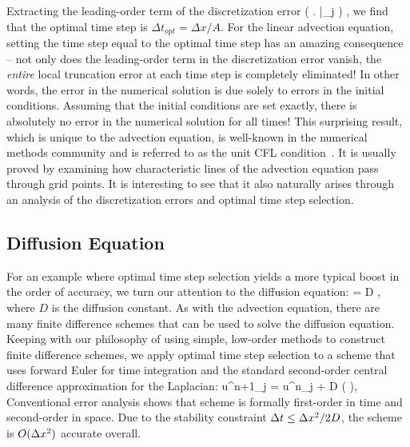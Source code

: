 \documentclass[oneeqnum,onefignum,onetabnum,onethmnum]{siamltex}
\begin{document}
Extracting the leading-order term of the discretization error
\beq
  \left( \left.   \right|_j \right)
  \left[ \dx - A \dt \right] \dt,
\eeq
we find that the optimal time step is $\Delta t_{opt} = \Delta x / A$.
For the linear advection equation, setting the time step equal to the optimal 
time step has an amazing consequence -- not only does the leading-order term
in the discretization error vanish, the \emph{entire} local truncation 
error at each time step is completely eliminated!  In other words, the error 
in the numerical solution is due solely to errors in the initial conditions.
Assuming that the initial conditions are set exactly, there is absolutely no 
error in the numerical solution for all times!  
This surprising result, which is unique to the advection equation, is 
well-known in the numerical methods community and is referred to as the unit 
CFL condition~\cite{leveque_book_2002}.  It is usually proved by examining 
how characteristic lines of the advection equation pass through grid points.  
It is interesting to see that it also naturally arises through an analysis of 
the discretization errors and optimal time step selection.


\subsection{Diffusion Equation}
For an example where optimal time step selection yields a more typical boost 
in the order of accuracy, we turn our attention to the diffusion equation:
\beq
   = D ,
  \label{eq:diffusion_eqn_1d}
\eeq
where $D$ is the diffusion constant.  As with the advection equation,
there are many finite difference schemes that can be used to solve the 
diffusion equation.  Keeping with our philosophy of using simple, low-order 
methods to construct finite difference schemes, we apply optimal time step 
selection to a scheme that uses forward Euler for time integration and the 
standard second-order central difference approximation for the Laplacian:
\beq
  u^{n+1}_j = u^{n}_j 
  + D \dt 
    \left(  \right),
  \label{eq:diffusion_eqn_1d_FD_scheme}
\eeq
Conventional error analysis shows that scheme is formally first-order in time 
and second-order in space.  Due to the stability constraint 
$\Delta t \le \Delta x^2/2D$, the scheme is $O(\Delta x^2)$ accurate overall.
\end{document}
